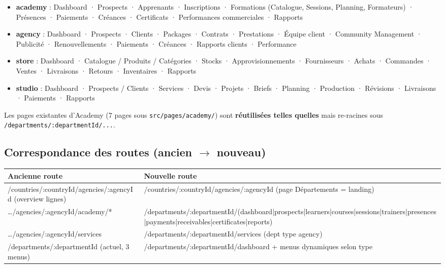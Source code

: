 \documentclass[11pt,a4paper]{article}
\begin{document}
\begin{itemize}[nosep]
  \item \textbf{academy} : Dashboard · Prospects · Apprenants · Inscriptions · Formations (Catalogue, Sessions, Planning, Formateurs) · Présences · Paiements · Créances · Certificats · Performances commerciales · Rapports
  \item \textbf{agency} : Dashboard · Prospects · Clients · Packages · Contrats · Prestations · Équipe client · Community Management · Publicité · Renouvellements · Paiements · Créances · Rapports clients · Performance
  \item \textbf{store} : Dashboard · Catalogue / Produits / Catégories · Stocks · Approvisionnements · Fournisseurs · Achats · Commandes · Ventes · Livraisons · Retours · Inventaires · Rapports
  \item \textbf{studio} : Dashboard · Prospects / Clients · Services · Devis · Projets · Briefs · Planning · Production · Révisions · Livraisons · Paiements · Rapports
\end{itemize}

Les pages existantes d'Academy (7 pages sous \verb|src/pages/academy/|) sont \textbf{réutilisées telles quelles} mais re-racines sous \verb|/departments/:departmentId/...|.

\subsection{Correspondance des routes (ancien $\rightarrow$ nouveau)}

\begin{tabularx}{\textwidth}{|Y|Y|}
\hline
{}\textbf{Ancienne route} & \textbf{Nouvelle route} \\ \hline
/countries/:countryId/agencies/:agencyId (overview lignes) & /countries/:countryId/agencies/:agencyId (page Départements = landing) \\ \hline
\ldots/agencies/:agencyId/academy/* & /departments/:departmentId/(dashboard|prospects|learners|courses|sessions|trainers|presences|payments|receivables|certificates|reports) \\ \hline
\ldots/agencies/:agencyId/services & /departments/:departmentId/services (dept type agency) \\ \hline
/departments/:departmentId (actuel, 3 menus) & /departments/:departmentId/dashboard + menus dynamiques selon type \\ \hline
\end{tabularx}
\end{document}
